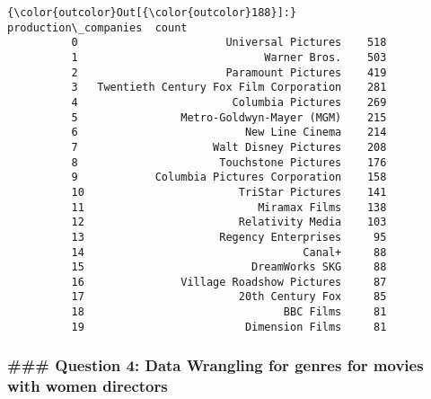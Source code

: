 \documentclass[11pt]{article}
\begin{document}
\begin{Verbatim}[commandchars=\\\{\}]
{\color{outcolor}Out[{\color{outcolor}188}]:}                       production\_companies  count
          0                       Universal Pictures    518
          1                             Warner Bros.    503
          2                       Paramount Pictures    419
          3   Twentieth Century Fox Film Corporation    281
          4                        Columbia Pictures    269
          5                Metro-Goldwyn-Mayer (MGM)    215
          6                          New Line Cinema    214
          7                     Walt Disney Pictures    208
          8                      Touchstone Pictures    176
          9            Columbia Pictures Corporation    158
          10                        TriStar Pictures    141
          11                           Miramax Films    138
          12                        Relativity Media    103
          13                     Regency Enterprises     95
          14                                  Canal+     88
          15                          DreamWorks SKG     88
          16               Village Roadshow Pictures     87
          17                        20th Century Fox     85
          18                               BBC Films     81
          19                         Dimension Films     81
\end{Verbatim}
            
    \hypertarget{question-4-data-wrangling-for-genres-for-movies-with-women-directors}{%
\subsubsection{\#\#\# Question 4: Data Wrangling for genres for movies
with women
directors}\label{question-4-data-wrangling-for-genres-for-movies-with-women-directors}}
\end{document}
